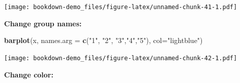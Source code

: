 \documentclass[]{book}
\newenvironment{Shaded}{\begin{snugshade}}{\end{snugshade}}
\newcommand{\KeywordTok}[1]{\textcolor[rgb]{0.13,0.29,0.53}{\textbf{#1}}}
\newcommand{\DataTypeTok}[1]{\textcolor[rgb]{0.13,0.29,0.53}{#1}}
\newcommand{\DecValTok}[1]{\textcolor[rgb]{0.00,0.00,0.81}{#1}}
\newcommand{\FloatTok}[1]{\textcolor[rgb]{0.00,0.00,0.81}{#1}}
\newcommand{\StringTok}[1]{\textcolor[rgb]{0.31,0.60,0.02}{#1}}
\newcommand{\OtherTok}[1]{\textcolor[rgb]{0.56,0.35,0.01}{#1}}
\newcommand{\OperatorTok}[1]{\textcolor[rgb]{0.81,0.36,0.00}{\textbf{#1}}}
\newcommand{\NormalTok}[1]{#1}
\begin{document}
\begin{Shaded}
\end{Shaded}

\texttt{[image: bookdown-demo\_files/figure-latex/unnamed-chunk-41-1.pdf]}

\textbf{Change group names: }

\begin{Shaded}
\begin{Highlighting}[]
\KeywordTok{barplot}\NormalTok{(x, }\DataTypeTok{names.arg =} \KeywordTok{c}\NormalTok{(}\StringTok{"1"}\NormalTok{, }\StringTok{"2"}\NormalTok{, }\StringTok{"3"}\NormalTok{,}\StringTok{"4"}\NormalTok{,}\StringTok{"5"}\NormalTok{), }\DataTypeTok{col=}\StringTok{"lightblue"}\NormalTok{)}
\end{Highlighting}
\end{Shaded}

\texttt{[image: bookdown-demo\_files/figure-latex/unnamed-chunk-42-1.pdf]}

\textbf{Change color:}
\end{document}
